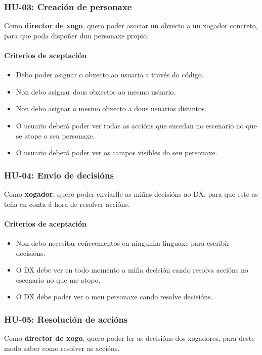 \subsubsection{HU-03: Creación de personaxe}
Como \textbf{director de xogo}, quero poder asociar un obxecto a un xogador
concreto, para que poda dispoñer dun personaxe propio.
\paragraph{Criterios de aceptación}
\begin{itemize}
  \item Debo poder asignar o obxecto ao usuario a través do código.
  \item Non debo asignar dous obxectos ao mesmo usuario.
  \item Non debo asignar o mesmo obxecto a dous usuarios distintos.
  \item O usuario deberá poder ver todas as accións que sucedan no escenario no
  que se atope o seu personaxe.
  \item O usuario deberá poder ver os campos visibles do seu personaxe.
\end{itemize}

\subsubsection{HU-04: Envío de decisións}
Como \textbf{xogador}, quero poder enviarlle as miñas decisións ao DX, para que
este as teña en conta á hora de resolver accións.
\paragraph{Criterios de aceptación}
\begin{itemize}
  \item Non debo necesitar coñecementos en ningunha linguaxe para escribir
  decisións.
  \item O DX debe ver en todo momento a miña decisión cando resolva accións no
  escenario no que me atopo.
  \item O DX debe poder ver o meu personaxe cando resolve decisións.
\end{itemize}

\subsubsection{HU-05: Resolución de accións}
Como \textbf{director de xogo}, quero poder ler as decisións dos xogadores, para
deste modo saber como resolver as accións.
